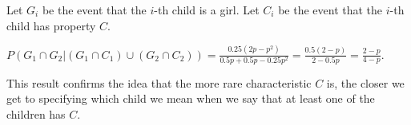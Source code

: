 Let $G_{i}$ be the event that the $i$-th child is a girl. Let $C_{i}$ be the
event that the $i$-th child has property $C$.

$P(G_{1} \cap G_{2}|(G_{1} \cap C_{1} )\cup (G_{2} \cap C_{2})) = \frac{0.25
(2p - p^{2})}{0.5p+ 0.5p - 0.25p^{2}} = \frac{0.5(2-p)}{2-0.5p} = 
\frac{2-p}{4-p}.$

This result confirms the idea that the more rare characteristic $C$ is, the
closer we get to specifying which child we mean when we say that at least one of
the children has $C$.